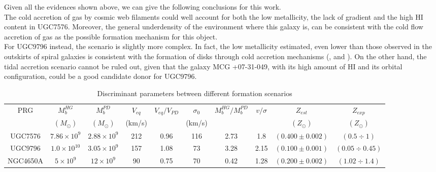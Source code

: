 \documentclass{aa}
\begin{document}
Given all the evidences shown above, we can give the following
conclusions for this work.\\ The cold accretion of gas by cosmic web
filaments could well account for both the low metallicity, the lack of
gradient and the high HI content in UGC7576. Moreover, the general
underdensity of the environment where this galaxy is, can be
consistent with the cold flow accretion of gas as the possible
formation mechanism for this object.\\ For UGC9796 instead, the
scenario is slightly more complex. In fact, the low metallicity
estimated, even lower than those observed in the outskirts of spiral
galaxies is consistent with the formation of disks through cold
accretion mechanisms (\citealt{Dek06}, \citealt{Ocv08} and
\citealt{Age09}). On the other hand, the tidal accretion scenario
cannot be ruled out, given that the galaxy MCG +07-31-049, with its
high amount of HI and its orbital configuration, could be a good
candidate donor for UGC9796.


\begin{table}
\caption{Discriminant parameters between different formation scenarios}   %
\label{scenarios}      %
\centering                          %
\begin{tabular}{c c c c c c c c c c}        %
\hline\hline                 %
PRG & $M_{b}^{HG}$ & $M_{b}^{PD}$ & $V_{eq}$ & $V_{eq}/V_{PD}$ & $\sigma_{0}$ & $M_{b}^{HG}/M_{b}^{PD}$ & $v/ \sigma$ & $Z_{est}$ & $Z_{exp}$ \\    %
 & $(M_{\odot})$ & $(M_{\odot})$ & (km/s)& & (km/s)& & &$(Z_{\odot})$ & $(Z_{\odot})$\\
\hline                        %
   UGC7576 & $7.86\times 10^{9}$ & $2.88\times 10^{9}$ & 212 & 0.96 & 116 & 2.73 & 1.8 & $(0.400\pm 0.002)$ & $(0.5\div 1)$ \\      %
   UGC9796 &$1.0\times 10^{10}$ & $3.05\times 10^{9}$ & 157 & 1.08 & 73 & 3.28 & 2.15 & $(0.100\pm 0.001)$ & $(0.05\div 0.45)$ \\
   NGC4650A &$5\times 10^{9}$ &$12\times 10^{9}$ &90 &0.75 & 70 &0.42&1.28 & $(0.200\pm 0.002)$ & $(1.02\div 1.4)$  \\
\hline                                   %
\end{tabular}
\end{table}
\end{document}
